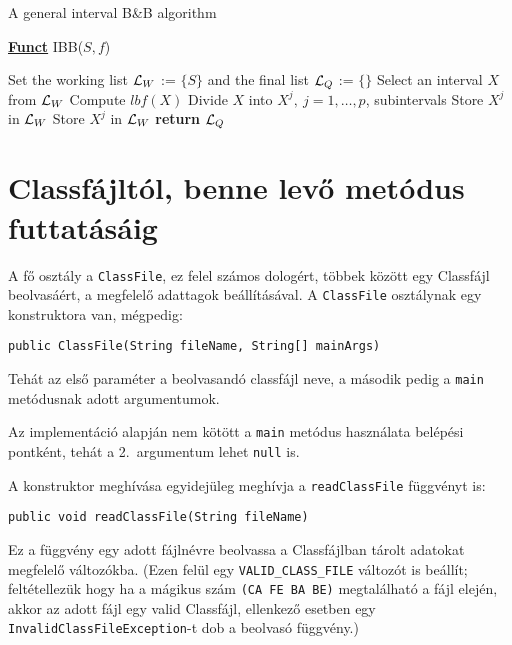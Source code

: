 \begin{algorithm}[H]
\caption{A general interval B\&B algorithm}
\label{alg:ibb}
\textbf{\underline{Funct}} IBB($S,f$)
\begin{algorithmic}[1] %
\State Set the working list ${\cal L}_W$ := $\{S\}$ and the final list ${\cal L}_Q$ := $\{\}$
 \label{alg:igoend}
	\State Select an interval $X$ from ${\cal L}_W$ \label{step:selrule}
	\State Compute $lbf(X)$ 
	 
		\State Divide $X$ into $X^j,\ j=1,\dots, p$, subintervals   
			 
				\State Store $X^j$ in ${\cal L}_W$
			\Else
				\State Store $X^j$ in ${\cal L}_W$
			\EndIf
		\EndFor
	\EndIf
\EndWhile
\State \textbf{return} ${\cal L}_Q$
\end{algorithmic}
\end{algorithm}

\section{Classfájltól, benne levő metódus futtatásáig}

A fő osztály a \lstinline{ClassFile}, ez felel számos dologért, többek között egy Classfájl beolvasáért, a megfelelő adattagok beállításával. A \lstinline{ClassFile} osztálynak egy konstruktora van, mégpedig:
\begin{verbatim}
public ClassFile(String fileName, String[] mainArgs)
\end{verbatim}
Tehát az első paraméter a beolvasandó classfájl neve, a második pedig a \lstinline{main} metódusnak adott argumentumok.

Az implementáció alapján nem kötött a \lstinline{main} metódus használata belépési pontként, tehát a 2.\ argumentum lehet \lstinline{null} is.

A konstruktor meghívása egyidejüleg meghívja a \lstinline{readClassFile} függvényt is:
\begin{verbatim}
public void readClassFile(String fileName)
\end{verbatim}
Ez a függvény egy adott fájlnévre beolvassa a Classfájlban tárolt adatokat megfelelő változókba.
(Ezen felül egy \lstinline{VALID_CLASS_FILE} változót is beállít; feltétellezük hogy ha a mágikus szám \lstinline{(CA FE BA BE)} megtalálható a fájl elején, akkor az adott fájl egy valid Classfájl, ellenkező esetben egy \lstinline{InvalidClassFileException}-t dob a beolvasó függvény.)

